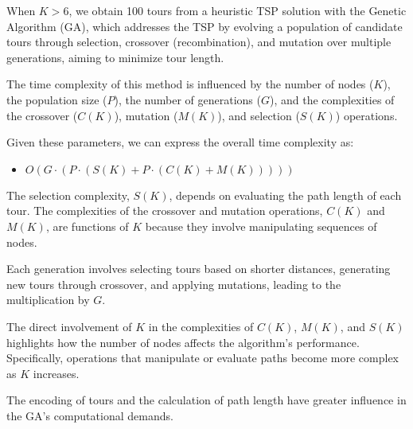 \documentclass[preprint,authoryear]{elsarticle}
\begin{document}
{When $K > 6$, we obtain 100 tours from a heuristic TSP solution with the Genetic Algorithm (GA), which addresses the TSP by evolving a population of candidate tours through selection, crossover (recombination), and mutation over multiple generations, aiming to minimize tour length.

The time complexity of this method is influenced by the number of nodes (\(K\)), the population size (\(P\)), the number of generations (\(G\)), and the complexities of the crossover (\(C(K)\)), mutation (\(M(K)\)), and selection (\(S(K)\)) operations.

Given these parameters, we can express the overall time complexity as:
\begin{itemize}
	\item $O(G \cdot (P \cdot (S(K) + P \cdot (C(K) + M(K)))))$
\end{itemize}

The selection complexity, \(S(K)\), depends on evaluating the path length of each tour.
The complexities of the crossover and mutation operations, \(C(K)\) and \(M(K)\), are functions of \(K\) because they involve manipulating sequences of nodes.

Each generation involves selecting tours based on shorter distances, generating new tours through crossover, and applying mutations, leading to the multiplication by \(G\).

The direct involvement of \(K\) in the complexities of \(C(K)\), \(M(K)\), and \(S(K)\) highlights how the number of nodes affects the algorithm's performance. Specifically, operations that manipulate or evaluate paths become more complex as \(K\) increases.

The encoding of tours and the calculation of path length have greater influence in the GA's computational demands.

}
\end{document}
